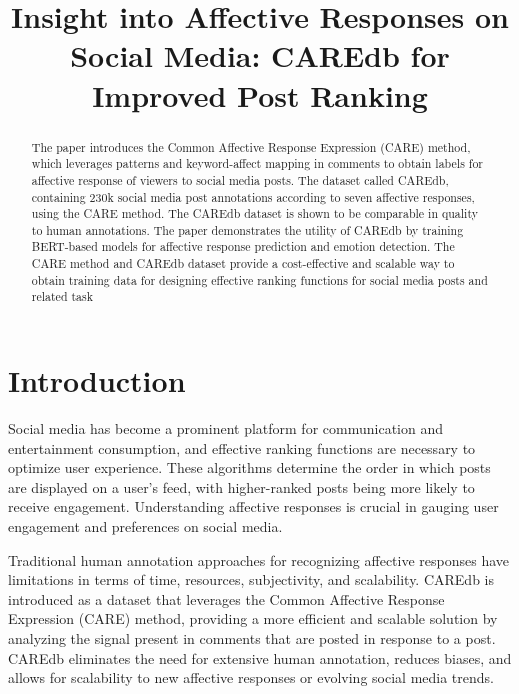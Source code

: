 \documentclass[conference]{IEEEtran}
\begin{document}
\title{Insight into Affective Responses on Social Media: CAREdb for Improved Post Ranking}
\author{
}
\maketitle

\begin{abstract}
The paper introduces the Common Affective Response Expression (CARE) method, which leverages patterns and keyword-affect mapping in comments to obtain labels for affective response of viewers to social media posts. The dataset called CAREdb, containing 230k social media post annotations according to seven affective responses, using the CARE method. The CAREdb dataset is shown to be comparable in quality to human annotations. The paper demonstrates the utility of CAREdb by training BERT-based models for affective response prediction and emotion detection. The CARE method and CAREdb dataset provide a cost-effective and scalable way to obtain training data for designing effective ranking functions for social media posts and related task
\end{abstract}

\section{Introduction}
Social media has become a prominent platform for communication and entertainment consumption, and effective ranking functions are necessary to optimize user experience. These algorithms determine the order in which posts are displayed on a user's feed, with higher-ranked posts being more likely to receive engagement. Understanding affective responses is crucial in gauging user engagement and preferences on social media.

Traditional human annotation approaches for recognizing affective responses have limitations in terms of time, resources, subjectivity, and scalability. CAREdb is introduced as a dataset that leverages the Common Affective Response Expression (CARE) method, providing a more efficient and scalable solution by analyzing the signal present in comments that are posted in response to a post. CAREdb eliminates the need for extensive human annotation, reduces biases, and allows for scalability to new affective responses or evolving social media trends.
\end{document}
